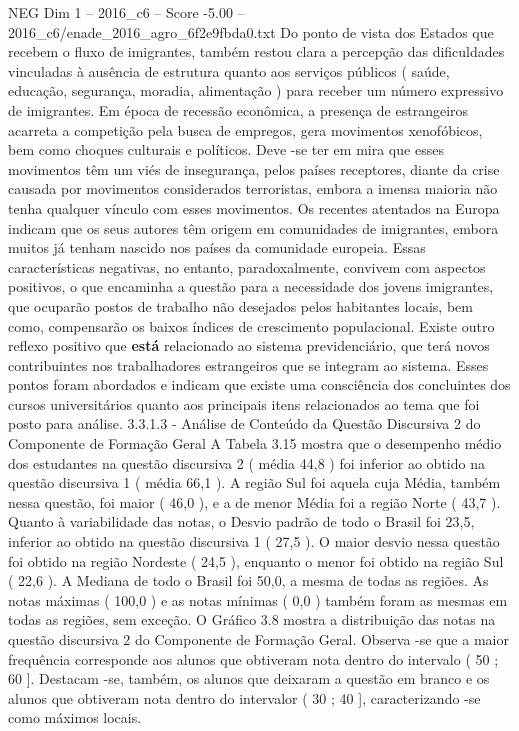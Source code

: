 \begin{textsample}{NEG Dim 1 – 2016\_c6 – Score -5.00 – 2016\_c6/enade\_2016\_agro\_6f2e9fbda0.txt}
Do ponto de vista dos Estados que recebem o fluxo de imigrantes, também restou clara a percepção das dificuldades vinculadas à ausência de estrutura quanto aos serviços públicos ( saúde, educação, segurança, moradia, alimentação ) para receber um número expressivo de imigrantes.
Em época de recessão econômica, a presença de estrangeiros acarreta a competição pela busca de empregos, gera movimentos xenofóbicos, bem como choques culturais e políticos.
Deve -se ter em mira que esses movimentos têm um viés de insegurança, pelos países receptores, diante da crise causada por movimentos considerados terroristas, embora a imensa maioria não tenha qualquer vínculo com esses movimentos.
Os recentes atentados na Europa indicam que os seus autores têm origem em comunidades de imigrantes, embora muitos já tenham nascido nos países da comunidade europeia.
Essas características negativas, no entanto, paradoxalmente, convivem com aspectos positivos, o que encaminha a questão para a necessidade dos jovens imigrantes, que ocuparão postos de trabalho não desejados pelos habitantes locais, bem como, compensarão os baixos índices de crescimento populacional.
Existe outro reflexo positivo que \textbf{está} relacionado ao sistema previdenciário, que terá novos contribuintes nos trabalhadores estrangeiros que se integram ao sistema.
Esses pontos foram abordados e indicam que existe uma consciência dos concluintes dos cursos universitários quanto aos principais itens relacionados ao tema que foi posto para análise. 3.3.1.3 - Análise de Conteúdo da Questão Discursiva 2 do Componente de Formação Geral A Tabela 3.15 mostra que o desempenho médio dos estudantes na questão discursiva 2 ( média 44,8 ) foi inferior ao obtido na questão discursiva 1 ( média 66,1 ).
A região Sul foi aquela cuja Média, também nessa questão, foi maior ( 46,0 ), e a de menor Média foi a região Norte ( 43,7 ).
Quanto à variabilidade das notas, o Desvio padrão de todo o Brasil foi 23,5, inferior ao obtido na questão discursiva 1 ( 27,5 ).
O maior desvio nessa questão foi obtido na região Nordeste ( 24,5 ), enquanto o menor foi obtido na região Sul ( 22,6 ).
A Mediana de todo o Brasil foi 50,0, a mesma de todas as regiões.
As notas máximas ( 100,0 ) e as notas mínimas ( 0,0 ) também foram as mesmas em todas as regiões, sem exceção.
O Gráfico 3.8 mostra a distribuição das notas na questão discursiva 2 do Componente de Formação Geral.
Observa -se que a maior frequência corresponde aos alunos que obtiveram nota dentro do intervalo ( 50 ; 60 ].
Destacam -se, também, os alunos que deixaram a questão em branco e os alunos que obtiveram nota dentro do intervalor ( 30 ; 40 ], caracterizando -se como máximos locais.

\end{textsample}
